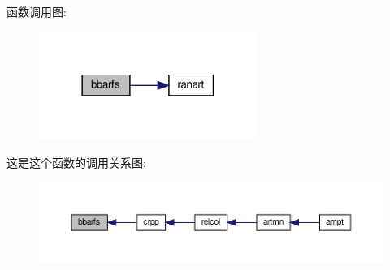 函数调用图\+:
\nopagebreak
\begin{figure}[H]
\begin{center}
\leavevmode
\includegraphics[width=201pt]{bbarfs_8f90_ad1f267f9b3425b9623dd2a870b934e01_cgraph}
\end{center}
\end{figure}
这是这个函数的调用关系图\+:
\nopagebreak
\begin{figure}[H]
\begin{center}
\leavevmode
\includegraphics[width=350pt]{bbarfs_8f90_ad1f267f9b3425b9623dd2a870b934e01_icgraph}
\end{center}
\end{figure}
